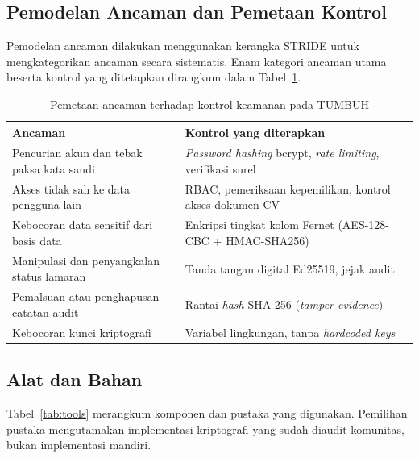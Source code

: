 \documentclass[12pt,a4paper]{article}
\begin{document}
\subsection{Pemodelan Ancaman dan Pemetaan Kontrol}

Pemodelan ancaman dilakukan menggunakan kerangka STRIDE untuk
mengkategorikan ancaman secara sistematis. Enam kategori ancaman utama
beserta kontrol yang ditetapkan dirangkum dalam Tabel~\ref{tab:threatmap}.

\begin{table}[H]
  \caption{Pemetaan ancaman terhadap kontrol keamanan pada TUMBUH}
  \label{tab:threatmap}
  \centering
  \begin{tabularx}{\textwidth}{X X}
    \toprule
    Ancaman & Kontrol yang diterapkan \\
    \midrule
    Pencurian akun dan tebak paksa kata sandi
      & \textit{Password hashing} bcrypt, \textit{rate limiting},
        verifikasi surel \\
    Akses tidak sah ke data pengguna lain
      & RBAC, pemeriksaan kepemilikan, kontrol akses dokumen CV \\
    Kebocoran data sensitif dari basis data
      & Enkripsi tingkat kolom Fernet (AES-128-CBC + HMAC-SHA256) \\
    Manipulasi dan penyangkalan status lamaran
      & Tanda tangan digital Ed25519, jejak audit \\
    Pemalsuan atau penghapusan catatan audit
      & Rantai \textit{hash} SHA-256 (\textit{tamper evidence}) \\
    Kebocoran kunci kriptografi
      & Variabel lingkungan, tanpa \textit{hardcoded keys} \\
    \bottomrule
  \end{tabularx}
\end{table}

\subsection{Alat dan Bahan}

Tabel~\ref{tab:tools} merangkum komponen dan pustaka yang digunakan.
Pemilihan pustaka mengutamakan implementasi kriptografi yang sudah
diaudit komunitas, bukan implementasi mandiri.
\end{document}
